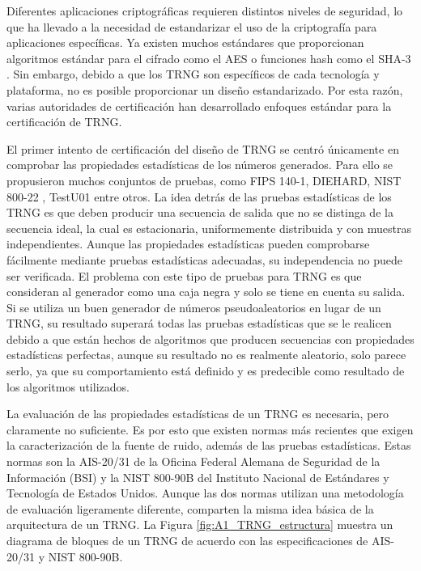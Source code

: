 	
            Diferentes aplicaciones criptográficas requieren distintos niveles de seguridad, lo que ha llevado a la necesidad de estandarizar el uso de la criptografía para aplicaciones específicas. Ya existen muchos estándares que proporcionan algoritmos estándar para el cifrado como el AES \cite{Dworkin2001, JoanDaemen2020} o funciones hash como el SHA-3 \cite{Dang2015}. Sin embargo, debido a que los TRNG son específicos de cada tecnología y plataforma, no es posible proporcionar un diseño estandarizado. Por esta razón, varias autoridades de certificación han desarrollado enfoques estándar para la certificación de TRNG.

            El primer intento de certificación del diseño de TRNG se centró únicamente en comprobar las propiedades estadísticas de los números generados. Para ello se propusieron muchos conjuntos de pruebas, como FIPS 140-1, DIEHARD, NIST 800-22 \cite{Nist2010}, TestU01 entre otros. La idea detrás de las pruebas estadísticas de los TRNG es que deben producir una secuencia de salida que no se distinga de la secuencia ideal, la cual es estacionaria, uniformemente distribuida y con muestras independientes. Aunque las propiedades estadísticas pueden comprobarse fácilmente mediante pruebas estadísticas adecuadas, su independencia no puede ser verificada. El problema con este tipo de pruebas para TRNG es que consideran al generador como una caja negra y solo se tiene en cuenta su salida. Si se utiliza un buen generador de números pseudoaleatorios en lugar de un TRNG, su resultado superará todas las pruebas estadísticas que se le realicen debido a que están hechos de algoritmos que producen secuencias con propiedades estadísticas perfectas, aunque su resultado no es realmente aleatorio, solo parece serlo, ya que su comportamiento está definido y es predecible como resultado de los algoritmos utilizados.

            La evaluación de las propiedades estadísticas de un TRNG es necesaria, pero claramente no suficiente. Es por esto que existen normas más recientes que exigen la caracterización de la fuente de ruido, además de las pruebas estadísticas. Estas normas son la AIS-20/31 \cite{AIS2011} de la Oficina Federal Alemana de Seguridad de la Información (BSI) y la NIST 800-90B \cite{Turan2018} del Instituto Nacional de Estándares y Tecnología de Estados Unidos. Aunque las dos normas utilizan una metodología de evaluación ligeramente diferente, comparten la misma idea básica de la arquitectura de un TRNG. La Figura \ref{fig:A1_TRNG_estructura} muestra un diagrama de bloques de un TRNG de acuerdo con las especificaciones de AIS-20/31 y NIST 800-90B.

